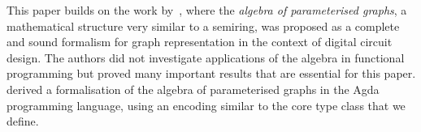 This paper builds on the work by~\citet{2014_algebra_mokhov}, where
the \emph{algebra of parameterised graphs}, a mathematical
structure very similar to a semiring, was proposed as a complete and sound formalism
for graph representation in the context of digital circuit design. The authors did
not investigate applications of the algebra in functional programming but proved
many important results that are essential for this paper.
\citet{2014_alekseyev_phd} derived a formalisation of the algebra of parameterised
graphs in the Agda programming language, using an encoding similar to
the core type class that we define.

